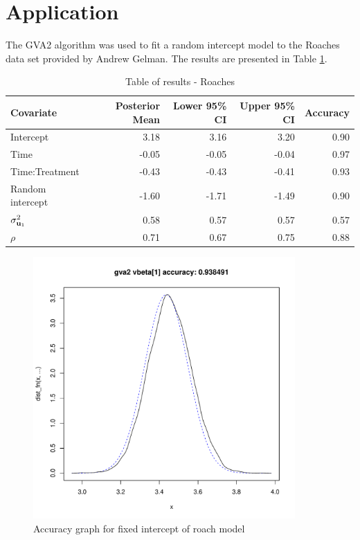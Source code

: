 \documentclass{article}[12pt]
\begin{document}
\section{Application}\label{sec:application}

The GVA2 algorithm was used to fit a random intercept model to the Roaches data set provided
by Andrew Gelman. The results are presented in Table \ref{tab:application_roaches}.



\begin{table}
\caption{Table of results - Roaches}
\label{tab:application_roaches}
\begin{tabular}{|l|rrrr|}
\hline
Covariate & Posterior Mean & Lower 95\% CI &  Upper 95\% CI & Accuracy \\
\hline
Intercept & 3.18 & 3.16 & 3.20 & 0.90 \\
Time & -0.05 & -0.05 & -0.04 & 0.97 \\
Time:Treatment & -0.43 & -0.43 & -0.41 & 0.93 \\
Random intercept & -1.60 & -1.71 & -1.49 & 0.90 \\
$\sigma^2_{{\bf u}_1}$ & 0.58 & 0.57 & 0.57 & 0.57 \\
$\rho$ & 0.71 & 0.67 & 0.75 & 0.88 \\
\hline
\end{tabular}
\end{table}

\begin{figure}
\caption{Accuracy graph for fixed intercept of roach model}
\label{fig:accuracy_roach_intercept}
\includegraphics[width=100mm, height=100mm]{code/results/1_accuracy_plots_application_gva2.pdf}
\end{figure}
\end{document}
